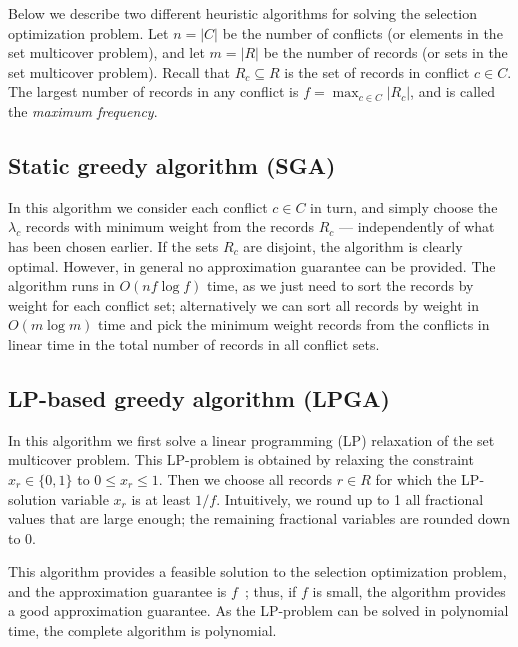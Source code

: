 Below we describe two different heuristic algorithms for solving the selection optimization problem. Let $n=|C|$ be the number of conflicts (or elements in the set multicover problem), and let $m=|R|$ be the number of records (or sets in the set multicover problem). Recall that $R_c \subseteq R$ is the set of records in conflict $c \in C$. The largest number of records in any conflict is $f = \max_{c \in C} |R_c|$, and is called the \emph{maximum frequency}.

\subsection{Static greedy algorithm (SGA)}
\label{sec:algorithms:sga}

In this algorithm we consider each conflict $c \in C$ in turn, and simply choose the $\lambda_c$ records with minimum weight from the records $R_c$ --- independently of what has been chosen earlier. If the sets $R_c$ are disjoint, the algorithm is clearly optimal. However, in general no approximation guarantee can be provided. The algorithm runs in $O(n f \log f)$ time, as we just need to sort the records by weight for each conflict set; alternatively we can sort all records by weight in $O(m \log m)$ time and pick the minimum weight records from the conflicts in linear time in the total number of records in all conflict sets.

\subsection{LP-based greedy algorithm (LPGA)}
\label{sec:algorithms:lpga}

In this algorithm we first solve a linear programming (LP) relaxation of the set multicover problem. This LP-problem is obtained by relaxing the constraint $x_r \in \{0, 1\}$ to $0 \leq x_r \leq 1$. Then we choose all records $r \in R$ for which the LP-solution variable $x_r$ is at least $1 / f$. Intuitively, we round up to 1 all fractional values that are large enough; the remaining fractional variables are rounded down to 0.

This algorithm provides a feasible solution to the selection optimization problem, and the approximation guarantee is $f$~\cite{vazirani2001approximation}; thus, if $f$ is small, the algorithm provides a good approximation guarantee. As the LP-problem can be solved in polynomial time, the complete algorithm is polynomial.




